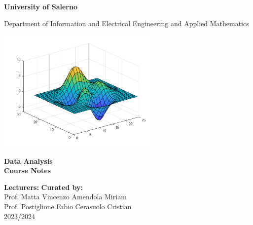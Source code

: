 
\begin{titlepage}

    \centering

    {\LARGE \textbf{University of Salerno}} \par
    \vspace{0.5cm}
    {\Large Department of Information and Electrical Engineering and Applied Mathematics} \par

    \vspace{1.5cm}

    \includegraphics[width=0.6\textwidth]{figures/logo.png} %
    
    \vspace{1.5cm}
    {\Huge \textbf{Data Analysis \\Course Notes}} \par

    \vfill

    \textbf{Lecturers:} \hfill \textbf{Curated by:} \\
    Prof. Matta Vincenzo \hfill Amendola Miriam \\
    Prof. Postiglione Fabio \hfill Cerasuolo Cristian  \\
    \vspace{4cm}
    {\Large 2023/2024}

    \restoregeometry %

\end{titlepage}